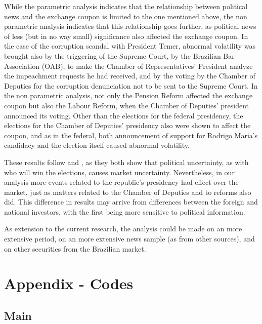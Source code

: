 \documentclass[cic,tc, english]{iiufrgs}
\begin{document}
    While the parametric analysis indicates that the relationship between political news and the exchange coupon is limited to the one mentioned above, the non parametric analysis indicates that this relationship goes further, as political news of less (but in no way small) significance also affected the exchange coupon. In the case of the corruption scandal with President Temer, abnormal volatility was brought also by the triggering of the Supreme Court, by the Brazilian Bar Association (OAB), to make the Chamber of Representatives' President analyze the impeachment requests he had received, and by the voting by the Chamber of Deputies for the corruption denunciation not to be sent to the Supreme Court. In the non parametric analysis, not only the Pension Reform affected the exchange coupon but also the Labour Reform, when the Chamber of Deputies' president announced its voting. Other than the elections for the federal presidency, the elections for the Chamber of Deputies' presidency also were shown to affect the coupon, and as in the federal, both announcement of support for Rodrigo Maria's candidacy and the election itself caused abnormal volatility.

    These results follow \citet{smales2015} and \citet{marquessantos2016}, as they both show that political uncertainty, as with who will win the elections, causes market uncertainty. Nevertheless, in our analysis more events related to the republic's presidency had effect over the market, just as matters related to the Chamber of Deputies and to reforms also did. This difference in results may arrive from differences between the foreign and national investors, with the first being more sensitive to political information.

    As extension to the current research, the analysis could be made on an more extensive period, on an more extensive news sample (as from other sources), and on other securities from the Brazilian market.



    
\chapter{Appendix - Codes} \label{chapter_appendix}

\section{Main}

    
\end{document}
